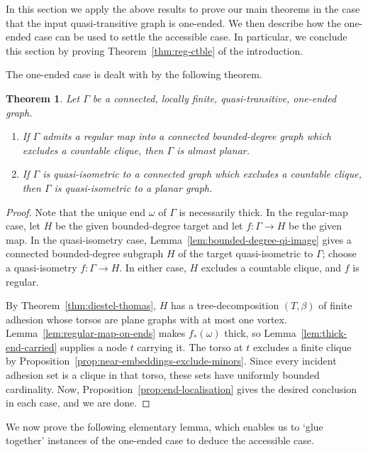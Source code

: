 \documentclass[10pt,a4paper]{amsart}
\newtheorem{theorem}{Theorem}[section]%
\theoremstyle{definition}
\begin{document}
In this section we apply the above results to prove our main theorems in the case that the input quasi-transitive graph is one-ended. We then describe how the one-ended case can be used to settle the accessible case. In particular, we conclude this section by proving Theorem~\ref{thm:reg-ctble} of the introduction. 

The one-ended case is dealt with by the following theorem. 


\begin{theorem}\label{thm:one-ended-rigidity}
Let $\Gamma$ be a connected, locally finite, quasi-transitive, one-ended graph.
\begin{enumerate}
\item If $\Gamma$ admits a regular map into a connected bounded-degree graph which excludes a countable clique, then $\Gamma$ is almost planar.
\item If $\Gamma$ is quasi-isometric to a connected graph which excludes a countable clique, then $\Gamma$ is quasi-isometric to a planar graph.
\end{enumerate}
\end{theorem}

\begin{proof}
Note that the unique end $\omega$ of $\Gamma$ is necessarily thick. 
In the regular-map case, let $H$ be the given bounded-degree target and let $f:\Gamma\to H$ be the given map.
In the quasi-isometry case, Lemma~\ref{lem:bounded-degree-qi-image} gives a connected bounded-degree subgraph $H$ of the target quasi-isometric to $\Gamma$; choose a quasi-isometry $f:\Gamma\to H$.
In either case, $H$ excludes a countable clique, and $f$ is regular.

By Theorem~\ref{thm:diestel-thomas}, $H$ has a tree-decomposition $(T,\beta)$ of finite adhesion whose torsos are plane graphs with at most one vortex.
Lemma~\ref{lem:regular-map-on-ends} makes $f_*(\omega)$ thick, so Lemma~\ref{lem:thick-end-carried} supplies a node $t$ carrying it.
The torso at $t$ excludes a finite clique by Proposition~\ref{prop:near-embeddings-exclude-minors}.
Since every incident adhesion set is a clique in that torso, these sets have uniformly bounded cardinality.
Now, Proposition~\ref{prop:end-localisation} gives the desired conclusion in each case, and we are done.
\end{proof}

We now prove the following elementary lemma, which enables us to `glue together' instances of the one-ended case to deduce the accessible case. 
\end{document}
